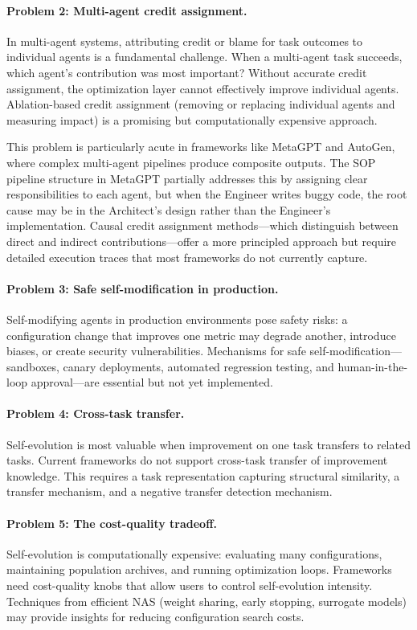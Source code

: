 \paragraph{Problem 2: Multi-agent credit assignment.}
In multi-agent systems, attributing credit or blame for task outcomes to individual agents is a fundamental challenge. When a multi-agent task succeeds, which agent's contribution was most important? Without accurate credit assignment, the optimization layer cannot effectively improve individual agents. Ablation-based credit assignment (removing or replacing individual agents and measuring impact) is a promising but computationally expensive approach.

This problem is particularly acute in frameworks like MetaGPT and AutoGen, where complex multi-agent pipelines produce composite outputs. The SOP pipeline structure in MetaGPT partially addresses this by assigning clear responsibilities to each agent, but when the Engineer writes buggy code, the root cause may be in the Architect's design rather than the Engineer's implementation. Causal credit assignment methods---which distinguish between direct and indirect contributions---offer a more principled approach but require detailed execution traces that most frameworks do not currently capture.

\paragraph{Problem 3: Safe self-modification in production.}
Self-modifying agents in production environments pose safety risks: a configuration change that improves one metric may degrade another, introduce biases, or create security vulnerabilities. Mechanisms for safe self-modification---sandboxes, canary deployments, automated regression testing, and human-in-the-loop approval---are essential but not yet implemented.

\paragraph{Problem 4: Cross-task transfer.}
Self-evolution is most valuable when improvement on one task transfers to related tasks. Current frameworks do not support cross-task transfer of improvement knowledge. This requires a task representation capturing structural similarity, a transfer mechanism, and a negative transfer detection mechanism.

\paragraph{Problem 5: The cost-quality tradeoff.}
Self-evolution is computationally expensive: evaluating many configurations, maintaining population archives, and running optimization loops. Frameworks need cost-quality knobs that allow users to control self-evolution intensity. Techniques from efficient NAS (weight sharing, early stopping, surrogate models) may provide insights for reducing configuration search costs.


